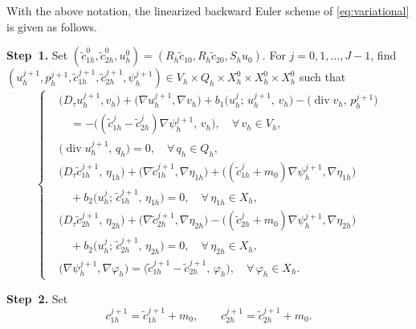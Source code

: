 With the above notation, the linearized backward Euler scheme of
\eqref{eq:variational} is given as follows.

\medskip
\noindent\textbf{Step~1.}
Set $(\tilde{c}^{0}_{1h},\tilde{c}^{0}_{2h},u^{0}_{h})
=(R_{h}\tilde{c}_{10},R_{h}\tilde{c}_{20},S_{h}u_{0})$.
For $j=0,1,\ldots,J-1$, find
$(u^{j+1}_{h},p^{j+1}_{h},\tilde{c}^{j+1}_{1h},
 \tilde{c}^{j+1}_{2h},\psi^{j+1}_{h})
\in V_{h}\times Q_{h}\times X^{0}_{h}\times X^{0}_{h}\times X^{0}_{h}$
such that
\begin{equation}
  \left\{
  \begin{aligned}
    &\bigl(D_{\tau}u^{j+1}_{h},v_{h}\bigr)
     + \bigl(\nabla u^{j+1}_{h},\nabla v_{h}\bigr)
     + b_{1}\bigl(u^{j}_{h};\,u^{j+1}_{h},\,v_{h}\bigr)
     - \bigl(\operatorname{div}v_{h},\,p^{j+1}_{h}\bigr)\\
    &\quad
     = -\bigl((\tilde{c}^{j}_{1h}-\tilde{c}^{j}_{2h})\nabla\psi^{j+1}_{h},\,v_{h}\bigr),
     \quad \forall\,v_{h}\in V_{h},\\[4pt]
    &\bigl(\operatorname{div}u^{j+1}_{h},\,q_{h}\bigr) = 0,
     \quad \forall\,q_{h}\in Q_{h},\\[4pt]
    &\bigl(D_{\tau}\tilde{c}^{j+1}_{1h},\,\eta_{1h}\bigr)
     + \bigl(\nabla\tilde{c}^{j+1}_{1h},\nabla\eta_{1h}\bigr)
     + \bigl((\tilde{c}^{j}_{1h}+m_{0})\nabla\psi^{j+1}_{h},\nabla\eta_{1h}\bigr)\\
    &\quad
     + b_{2}\bigl(u^{j}_{h};\,\tilde{c}^{j+1}_{1h},\,\eta_{1h}\bigr)
     = 0,
     \quad \forall\,\eta_{1h}\in X_{h},\\[4pt]
    &\bigl(D_{\tau}\tilde{c}^{j+1}_{2h},\,\eta_{2h}\bigr)
     + \bigl(\nabla\tilde{c}^{j+1}_{2h},\nabla\eta_{2h}\bigr)
     - \bigl((\tilde{c}^{j}_{2h}+m_{0})\nabla\psi^{j+1}_{h},\nabla\eta_{2h}\bigr)\\
    &\quad
     + b_{2}\bigl(u^{j}_{h};\,\tilde{c}^{j+1}_{2h},\,\eta_{2h}\bigr)
     = 0,
     \quad \forall\,\eta_{2h}\in X_{h},\\[4pt]
    &\bigl(\nabla\psi^{j+1}_{h},\nabla\varphi_{h}\bigr)
     = \bigl(\tilde{c}^{j+1}_{1h}-\tilde{c}^{j+1}_{2h},\,\varphi_{h}\bigr),
     \quad \forall\,\varphi_{h}\in X_{h}.
  \end{aligned}
  \right.
  \label{eq:scheme}
\end{equation}

\noindent\textbf{Step~2.} Set
\begin{equation}
  c^{j+1}_{1h} = \tilde{c}^{j+1}_{1h} + m_{0},
  \qquad
  c^{j+1}_{2h} = \tilde{c}^{j+1}_{2h} + m_{0}.
  \label{eq:c-recover}
\end{equation}

